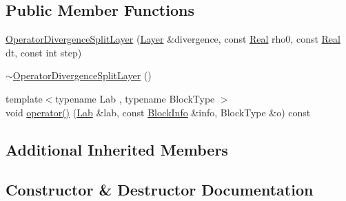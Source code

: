 \subsection*{Public Member Functions}
\begin{DoxyCompactItemize}
\item 
\hyperlink{class_operator_divergence_split_layer_adb870cc91b9c8ac69230cf5f35b625db}{Operator\+Divergence\+Split\+Layer} (\hyperlink{struct_layer}{Layer} \&divergence, const \hyperlink{_h_d_f5_dumper_8h_a445a5f0e2a34c9d97d69a3c2d1957907}{Real} rho0, const \hyperlink{_h_d_f5_dumper_8h_a445a5f0e2a34c9d97d69a3c2d1957907}{Real} dt, const int step)
\item 
\hyperlink{class_operator_divergence_split_layer_a72db398a6d2ecb9ac29b6db752802bda}{$\sim$\+Operator\+Divergence\+Split\+Layer} ()
\item 
{\footnotesize template$<$typename Lab , typename Block\+Type $>$ }\\void \hyperlink{class_operator_divergence_split_layer_a87a9676b91dbe960ebcb4a00463e4aa6}{operator()} (\hyperlink{_definitions_8h_ad6f951af9a2a6ebc1975404882b34314}{Lab} \&lab, const \hyperlink{struct_block_info}{Block\+Info} \&info, Block\+Type \&o) const 
\end{DoxyCompactItemize}
\subsection*{Additional Inherited Members}


\subsection{Constructor \& Destructor Documentation}
\hypertarget{class_operator_divergence_split_layer_adb870cc91b9c8ac69230cf5f35b625db}{}
